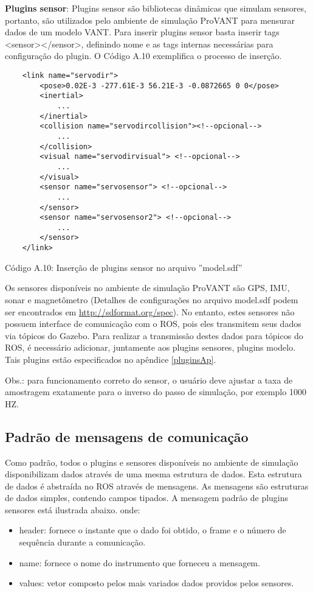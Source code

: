 	\vspace{1cm}
	
\noindent \textbf{Plugins sensor}: Plugins sensor são bibliotecas dinâmicas que simulam sensores, portanto, são utilizados pelo ambiente de simulação ProVANT para mensurar dados de um modelo VANT. Para inserir plugins sensor basta inserir tags <sensor></sensor>, definindo nome e as tags internas necessárias para configuração do plugin. O Código A.10 exemplifica o processo de inserção.

	
	\begin{verbatim}
	<link name="servodir">
		<pose>0.02E-3 -277.61E-3 56.21E-3 -0.0872665 0 0</pose>
		<inertial> 
			...
		</inertial>
		<collision name="servodircollision"><!--opcional-->
			...
		</collision>
		<visual name="servodirvisual"> <!--opcional-->
			...
		</visual>
		<sensor name="servosensor"> <!--opcional-->
			...
		</sensor>
		<sensor name="servosensor2"> <!--opcional-->
			...
		</sensor>
	</link>
	\end{verbatim}
	\centerline{Código A.10: Inserção de plugins sensor no arquivo ''model.sdf''}

	\vspace{1cm}

Os sensores disponíveis no ambiente de simulação ProVANT são GPS, IMU, sonar e magnetômetro (Detalhes de configurações no arquivo model.sdf podem ser encontrados em \url{http://sdformat.org/spec}). No entanto, estes sensores não possuem interface de comunicação com o ROS, pois eles transmitem seus dados via tópicos do Gazebo. Para realizar a transmissão destes dados para tópicos do ROS, é necessário adicionar, juntamente aos plugins sensores, plugins modelo. Tais plugins estão especificados no apêndice \ref{pluginsAp}.

Obs.: para funcionamento correto do sensor, o usuário deve ajustar a taxa de amostragem exatamente para o inverso do passo de simulação, por exemplo 1000 HZ.

\subsection{Padrão de mensagens de comunicação}

Como padrão, todos o plugins e sensores disponíveis no ambiente de simulação disponibilizam dados através de uma mesma estrutura de dados. Esta estrutura de dados é abstraída no ROS através de mensagens. As mensagens são estruturas de dados simples, contendo campos tipados. A mensagem padrão de plugins sensores está ilustrada abaixo. 	onde:
\begin{itemize}
\item header: fornece o instante que o dado foi obtido, o frame e o número de sequência durante a comunicação.
\item name: fornece o nome do instrumento que forneceu a mensagem.
\item values: vetor composto pelos mais variados dados providos pelos sensores.
\end{itemize} 

